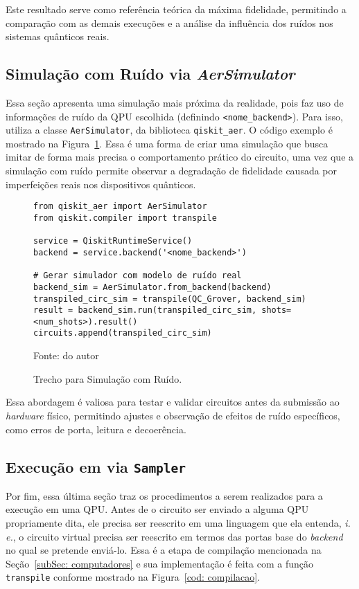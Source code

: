 Este resultado serve como referência teórica da máxima fidelidade, permitindo a comparação com as demais execuções e a análise da influência dos ruídos nos sistemas quânticos reais.

\subsection{Simulação com Ruído via \textit{AerSimulator}}
\label{subSec: simulacaoRuido}

Essa seção apresenta uma simulação mais próxima da realidade, pois faz uso de informações de ruído da QPU escolhida (definindo \texttt{<nome\_backend>}). Para isso, utiliza a classe \texttt{AerSimulator}, da biblioteca \texttt{qiskit\_aer}. O código exemplo é mostrado na Figura~\ref{cod: simulacaoRuido}. Essa é uma forma de criar uma simulação que busca imitar de forma mais precisa o comportamento prático do circuito, uma vez que a simulação com ruído permite observar a degradação de fidelidade causada por imperfeições reais nos dispositivos quânticos.

\begin{figure}[!htb]
\centering
\caption{Trecho para Simulação com Ruído.} 
\begin{verbatim}
from qiskit_aer import AerSimulator
from qiskit.compiler import transpile

service = QiskitRuntimeService()
backend = service.backend('<nome_backend>')

# Gerar simulador com modelo de ruído real
backend_sim = AerSimulator.from_backend(backend)
transpiled_circ_sim = transpile(QC_Grover, backend_sim)
result = backend_sim.run(transpiled_circ_sim, shots=<num_shots>).result()
circuits.append(transpiled_circ_sim)
\end{verbatim}
{\small Fonte: do autor} 
\label{cod: simulacaoRuido} 
\end{figure}

Essa abordagem é valiosa para testar e validar circuitos antes da submissão ao \textit{hardware} físico, permitindo ajustes e observação de efeitos de ruído específicos, como erros de porta, leitura e decoerência.

\subsection{Execução em  via \texttt{Sampler}}
\label{subSec: execucaoQPU}

Por fim, essa última seção traz os procedimentos a serem realizados para a execução em uma QPU. Antes de o circuito ser enviado a alguma QPU propriamente dita, ele precisa ser reescrito em uma linguagem que ela entenda, \textit{i. e.}, o circuito virtual precisa ser reescrito em termos das portas base do \textit{backend} no qual se pretende enviá-lo. Essa é a etapa de compilação mencionada na Seção~\ref{subSec: computadores} e sua implementação é feita com a função \texttt{transpile} conforme mostrado na Figura~\ref{cod: compilacao}.

